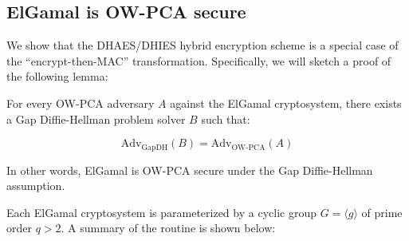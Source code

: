 \documentclass[journal=tches,submission]{iacrtrans}
\begin{document}
\subsection{ElGamal is OW-PCA secure}
We show that the DHAES/DHIES hybrid encryption scheme is a special case of the ``encrypt-then-MAC'' transformation. Specifically, we will sketch a proof of the following lemma:

\begin{lemma}\label{lemma:elgamal-is-ow-pca}
    For every OW-PCA adversary $A$ against the ElGamal cryptosystem, there exists a Gap Diffie-Hellman problem solver $B$ such that:

    \begin{equation*}
        \text{Adv}_\text{GapDH}(B) = \text{Adv}_\text{OW-PCA}(A)
    \end{equation*}

    In other words, ElGamal is OW-PCA secure under the Gap Diffie-Hellman assumption.
\end{lemma}

Each ElGamal cryptosystem \cite{DBLP:journals/tit/Elgamal85} is parameterized by a cyclic group $G = \langle g \rangle$ of prime order $q > 2$. A summary of the routine is shown below:
\end{document}
